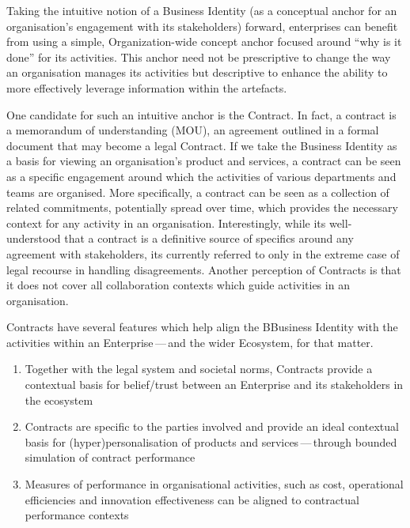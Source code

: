 Taking the intuitive notion of a Business Identity (as a conceptual anchor for an organisation’s engagement with
its stakeholders) forward, enterprises can benefit from using a simple, Organization-wide concept anchor
focused around “why is it done” for its activities. This anchor need not be prescriptive to change the way an
organisation manages its activities but descriptive to enhance the ability to more effectively leverage information
within the artefacts.

One candidate for such an intuitive anchor is the Contract.
In fact, a contract is a memorandum of understanding (MOU), an agreement outlined in a formal document
that may become a legal Contract.
If we take the Business Identity as a basis for viewing an organisation’s product and services,
a contract can be seen as a specific engagement around which the activities of various departments and teams are
organised.
More specifically, a contract can be seen as a collection of related commitments, potentially spread over time,
which provides the necessary context for any activity in an organisation.
Interestingly, while its well-understood that a contract is a definitive source of specifics around any
agreement with stakeholders, its currently referred to only in the extreme case of legal recourse in
handling disagreements.
Another perception of Contracts is that it does not cover all collaboration contexts which guide activities
in an organisation.

Contracts have several features which help align the BBusiness Identity with the activities
within an Enterprise\,---\,and the wider Ecosystem, for that matter.

\begin{enumerate}[label=\alph*]
    \item Together with the legal system and societal norms, Contracts provide a contextual basis for
          belief/trust between an Enterprise and its stakeholders in the ecosystem
    \item Contracts are specific to the parties involved and provide an ideal contextual basis for
          (hyper)personalisation of products and services\,---\,through bounded simulation of contract performance
    \item Measures of performance in organisational activities, such as cost, operational efficiencies and
          innovation effectiveness can be aligned to contractual performance contexts
\end{enumerate}

